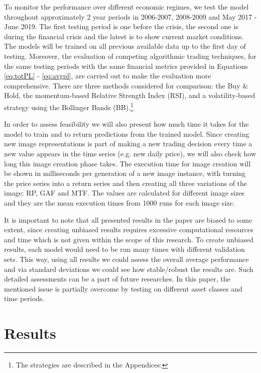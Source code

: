 \documentclass[11pt, a4paper]{article}
\begin{document}
To monitor the performance over different economic regimes, we test the model throughout approximately 2 year periods in 2006-2007, 2008-2009 and May 2017 - June 2019. The first testing period is one before the crisis, the second one is during the financial crisis and the latest is to show current market conditions. 
The models will be trained on all previous available data up to the first day of testing. 
Moreover, the evaluation of competing algorithmic trading techniques, for the same testing periods with the same financial metrics provided in Equations \ref{eq:totPL} - \ref{eq:avgpl}, are carried out to make the evaluation more comprehensive.
There are three methods considered for comparison: the Buy \& Hold, the momentum-based Relative Strength Index (RSI), and a volatility-based strategy using the Bollinger Bands (BB).\footnote{The strategies are described in the Appendices: }

In order to assess feasibility we will also present how much time it takes for the model to train and to return predictions from the trained model. Since creating new image representations is part of making a new trading decision every time a new value appears in the time series (e.g. new daily price), we will also check how long this image creation phase takes.
The execution time for image creation will be shown in milliseconds per generation of a new image instance, with turning the price series into a return series and then creating all three variations of the image: RP, GAF and MTF. The values are calculated for different image sizes and they are the mean execution times from 1000 runs for each image size.

It is important to note that all presented results in the paper are biased to some extent, since creating unbiased results requires excessive computational resources and time which is not given within the scope of this research. To create unbiased results, each model would need to be run many times with different validation sets. This way, using all results we could assess the overall average performance and via standard deviations we could see how stable/robust the results are. Such detailed assessments can be a part of future researches. In this paper, the mentioned issue is partially overcome by testing on different asset classes and time periods.

\section{Results}
\label{sec:ER}
\end{document}
